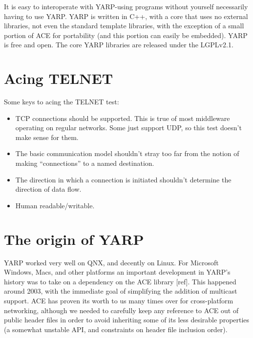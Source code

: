 \documentclass[letterpaper]{article}
\begin{document}
It is easy to interoperate with YARP-using programs
without yourself necessarily having to use YARP. 
YARP is written in C++, with a core that uses
no external libraries, not even the standard template libraries, with
the exception of a small portion of ACE for portability (and this
portion can easily be embedded). YARP is free and open.  The
core YARP libraries are released under the LGPLv2.1.


\section{Acing TELNET}

Some keys to acing the TELNET test:

\begin{itemize}

\item TCP connections should be supported.  
  This is true of most middleware operating on regular
  networks. Some just support UDP, so this test doesn't
  make sense for them.

\item The basic communication model shouldn't stray too far from the
  notion of making ``connections'' to a named destination.

\item The direction in which a connection is initiated shouldn't
  determine the direction of data flow.

\item Human readable/writable.

\end{itemize}




\section{The origin of YARP}


YARP worked very well on QNX, and decently on Linux.  For Microsoft
Windows, Macs, and other platforms an important development in YARP's
history was to take on a dependency on the ACE library [ref].  This
happened around 2003, with the immediate goal of simplifying the
addition of multicast support.  ACE has proven its worth to us many
times over for cross-platform networking, although we needed
to carefully keep any reference to ACE out of public header files
in order to avoid inheriting some of its less desirable properties
(a somewhat unstable API, and constraints on header file inclusion
order).
\end{document}
